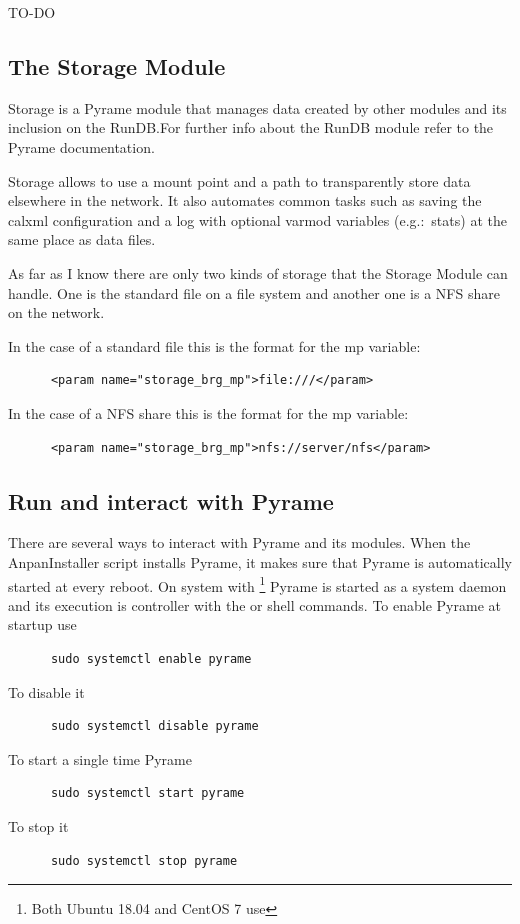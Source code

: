 TO-DO

\subsection{The Storage Module}\label{sec:STORAGE}

Storage is a Pyrame module that manages data created by other modules
and its inclusion on the RunDB.\@ For further info about the RunDB
module refer to the Pyrame documentation.

Storage allows to use a mount point and a path to transparently store
data elsewhere in the network. It also automates common tasks such as
saving the calxml configuration and a log with optional varmod
variables (e.g.:\ stats) at the same place as data files.

As far as I know there are only two kinds of storage that the Storage
Module can handle. One is the standard file on a file system and
another one is a NFS share on the network.

In the case of a standard file this is the format for the mp variable:
\begin{lstlisting}
      <param name="storage_brg_mp">file:///</param>
\end{lstlisting}
In the case of a NFS share this is the format for the mp variable:
\begin{lstlisting}
      <param name="storage_brg_mp">nfs://server/nfs</param>
\end{lstlisting}


\subsection{Run and interact with Pyrame}
There are several ways to interact with Pyrame and its modules. When
the AnpanInstaller script installs Pyrame, it makes sure that Pyrame
is automatically started at every reboot. On system with
\footnote{Both Ubuntu 18.04 and CentOS 7 use
  } Pyrame is started as a system daemon and its
execution is controller with the  or
 shell commands. To enable Pyrame at startup use
\begin{lstlisting}
      sudo systemctl enable pyrame
\end{lstlisting}
To disable it
\begin{lstlisting}
      sudo systemctl disable pyrame
\end{lstlisting}
To start a single time Pyrame
\begin{lstlisting}
      sudo systemctl start pyrame
\end{lstlisting}
To stop it
\begin{lstlisting}
      sudo systemctl stop pyrame
\end{lstlisting}

